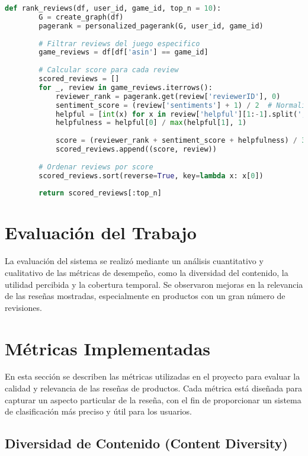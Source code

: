 \documentclass{llncs}
\begin{document}
    \begin{lstlisting}[language=Python, caption=Función para ordenar las reseñas]
    def rank_reviews(df, user_id, game_id, top_n = 10):
        G = create_graph(df)
        pagerank = personalized_pagerank(G, user_id, game_id)
        
        # Filtrar reviews del juego especifico
        game_reviews = df[df['asin'] == game_id]
        
        # Calcular score para cada review
        scored_reviews = []
        for _, review in game_reviews.iterrows():
            reviewer_rank = pagerank.get(review['reviewerID'], 0)
            sentiment_score = (review['sentiments'] + 1) / 2  # Normalizar a [0, 1]
            helpful = [int(x) for x in review['helpful'][1:-1].split(', ')]
            helpfulness = helpful[0] / max(helpful[1], 1)
            
            score = (reviewer_rank + sentiment_score + helpfulness) / 3
            scored_reviews.append((score, review))
        
        # Ordenar reviews por score
        scored_reviews.sort(reverse=True, key=lambda x: x[0])
        
        return scored_reviews[:top_n]
    \end{lstlisting}
    
    \section{Evaluación del Trabajo}
    La evaluación del sistema se realizó mediante un análisis cuantitativo y cualitativo de las métricas de desempeño, como la diversidad del contenido, la utilidad percibida y la cobertura temporal. Se observaron mejoras en la relevancia de las reseñas mostradas, especialmente en productos con un gran número de revisiones.

    \section{Métricas Implementadas}

    En esta sección se describen las métricas utilizadas en el proyecto para evaluar la calidad y relevancia de las reseñas de productos. Cada métrica está diseñada para capturar un aspecto particular de la reseña, con el fin de proporcionar un sistema de clasificación más preciso y útil para los usuarios.

    \subsection{Diversidad de Contenido (Content Diversity)}
\end{document}
